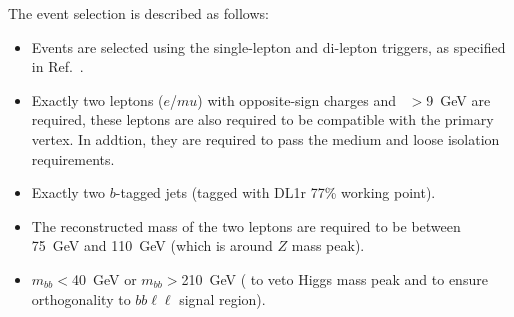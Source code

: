 The event selection is described as follows:

\begin{itemize}

    \item Events are selected using the single-lepton and di-lepton triggers, 
    as specified in Ref.~\cite{HDBS-2018-33}.
    \item Exactly two leptons ($e$/$mu$) with opposite-sign charges 
    and \pt\ $>$9~GeV are required, these leptons are also required
    to be compatible with the primary vertex. In addtion, they are required
    to pass the medium and loose isolation requirements.
    \item Exactly two $b$-tagged jets (tagged with DL1r 77\% working point).
    \item The reconstructed mass of the two leptons are required to be between 75~GeV
    and 110~GeV (which is around $Z$ mass peak).
    \item $m_{bb}<$40~GeV or $m_{bb}>$210~GeV (
    to veto Higgs mass peak and to ensure orthogonality to $bb\ell\ell$ signal region).

\end{itemize}



